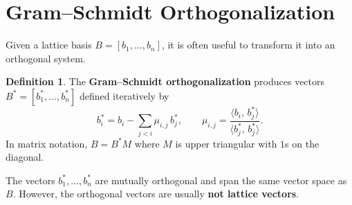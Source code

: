 \documentclass[11pt]{article}
\theoremstyle{plain}
\theoremstyle{definition}
\newtheorem{definition}[theorem]{Definition}
\begin{document}
\section{Gram--Schmidt Orthogonalization}

Given a lattice basis $B = [b_1, \ldots, b_n]$, it is often useful to transform it into an orthogonal system.

\begin{definition}
The \textbf{Gram--Schmidt orthogonalization} produces vectors $B^* = [b_1^*, \ldots, b_n^*]$ defined iteratively by
\[
  b_i^* = b_i - \sum_{j < i} \mu_{i,j}\,b_j^*, \qquad
  \mu_{i,j} = \frac{\langle b_i,\, b_j^*\rangle}{\langle b_j^*,\, b_j^*\rangle}.
\]
In matrix notation, $B = B^* M$ where $M$ is upper triangular with $1$s on the diagonal.
\end{definition}

The vectors $b_1^*, \ldots, b_n^*$ are mutually orthogonal and span the same vector space as $B$.
However, the orthogonal vectors are usually \textbf{not lattice vectors}.
\end{document}
